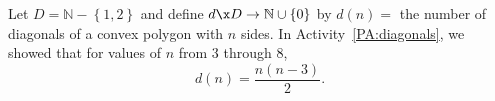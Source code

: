 \begin{enumerate}
%
%
%
%
%
%
%
%
%
%

\xitem Let  $D = \mathbb{N} - \left\{ {1, 2} \right\}$ and define  
$d\x D \to \mathbb{N} \cup \left\{ 0 \right\}$  by  $d( n ) = $ the number of diagonals of a convex polygon with  $n$  sides.  In \typeu Activity~\ref*{PA:diagonals}, we showed that for values of  $n$  from  3 through 8,  
\[
d( n ) = \frac{{n\left( {n - 3} \right)}}{2}.
\]


\end{enumerate}
